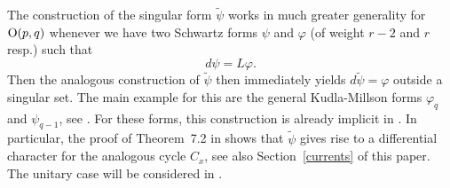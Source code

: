 \begin{remark}
The construction of the singular form $\tilde{\psi}$ works in much greater generality for $\operatorname{O}(p,q)$ whenever we have two Schwartz forms $\psi$ and $\varphi$ (of weight $r-2$ and $r$ resp.) such that 
\[
d \psi = L \varphi.
\]
Then the analogous construction of $\tilde{\psi}$ then immediately yields $d \tilde{\psi} = \varphi$ outside a singular set. The main example for this are the general Kudla-Millson forms $\varphi_{q}$ and $\psi_{q-1}$, see \cite{KM90}. For these forms, this construction is already implicit in \cite{BFDuke}. In particular, the proof of Theorem~7.2 in \cite{BFDuke} shows that $\tilde{\psi}$ gives rise to a differential character for the analogous cycle $C_x$, see also Section~\ref{currents} of this paper. The unitary case will be considered in \cite{F-unitary}. 
\end{remark}


